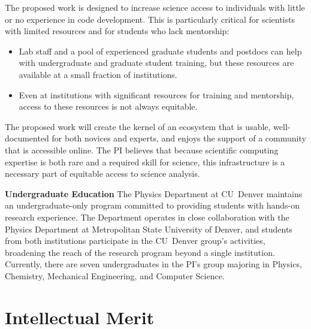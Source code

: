 The proposed work is designed to increase science access to individuals with little or no experience in code development.  This is particularly critical for scientists with limited resources and for students who lack mentorship: 

\begin{itemize}
    \item Lab staff and a pool of experienced graduate students and postdocs can help with undergraduate and graduate student training, but these resources are available at a small fraction of institutions.
    \item Even at institutions with significant resources for training and mentorship, access to these resources is not always equitable.  
\end{itemize}


The proposed work will create the kernel of an ecosystem that is usable, well-documented for both novices and experts, and enjoys the support of a community that is accessible online.  The PI believes that because scientific computing expertise is both rare and a required skill for science, this infrastructure is a necessary part of equitable access to science analysis.



\textbf{Undergraduate Education}
The Physics Department at CU~Denver maintains an undergraduate-only program committed to providing students with hands-on research experience. The Department operates in close collaboration with the Physics Department at Metropolitan State University of Denver, and students from both institutions participate in the CU~Denver group's activities, broadening the reach of the research program beyond a single institution. Currently, there are seven undergraduates in the PI's group majoring in Physics, Chemistry,  Mechanical Engineering, and Computer Science.  


\section{Intellectual Merit}

